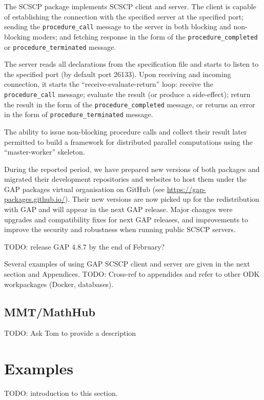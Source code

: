 \documentclass{deliverablereport}
\begin{document}
The SCSCP package implements SCSCP client and server. 
The client is capable of establishing the connection with the specified server
at the specified port; sending the {\tt procedure\_call} message to
the server in both blocking and non-blocking moders; and fetching
response in the form of the {\tt procedure\_completed} or
{\tt procedure\_terminated} message. 

The server reads all declarations from the specification file and starts
to listen to the specified port (by default port 26133). Upon receiving 
and incoming connection, it starts the ``receive-evaluate-return'' loop:
receive the {\tt procedure\_call} message; evaluate the result 
(or produce a side-effect); return the result in the form of the
{\tt procedure\_completed} message, or returns an error in the form
of {\tt procedure\_terminated} message.

The ability to issue non-blocking procedure calls and collect their result
later permitted to build a framework for distributed parallel computations
using the ``master-worker'' skeleton.

During the reported period, we have prepared new versions of 
both packages and migrated their development repositories and
websites to host them under the GAP packages virtual organisation 
on GitHub (see \url{https://gap-packages.github.io/}).
Their new versions are now picked up for the redistribution
with GAP and will appear in the next GAP release. Major changes
were upgrades and compatibility fixes for next GAP releases, 
and improvements to improve the security and robustness when
running public SCSCP servers. 

TODO: release GAP 4.8.7 by the end of February?

Several examples of using GAP SCSCP client and server are given
in the next section and Appendices. TODO: Cross-ref to appendides
and refer to other ODK workpackages (Docker, databases).


\subsection{MMT/MathHub}

TODO: Ask Tom to provide a description


\section{Examples}\label{examples}

TODO: introduction to this section. 
\end{document}
